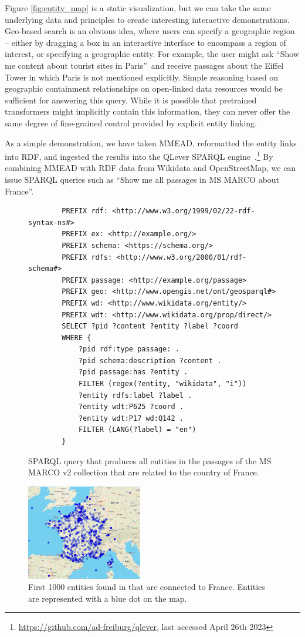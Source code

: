Figure \ref{fig:entity_map} is a static visualization, but we can take the same underlying data and principles to create interesting interactive demonstrations.
Geo-based search is an obvious idea, where users can specify a geographic region -- either by dragging a box in an interactive interface to encompass a region of interest, or specifying a geographic entity.
For example, the user might ask ``Show me content about tourist sites in Paris''\ and receive passages about the Eiffel Tower in which Paris is not mentioned explicitly.
Simple reasoning based on geographic containment relationships on open-linked data resources would be sufficient for answering this query.
While it is possible that pretrained transformers might implicitly contain this information, they can never offer the same degree of fine-grained control provided by explicit entity linking.

As a simple demonstration, we have taken MMEAD, reformatted the entity links into RDF, and ingested the results into the QLever SPARQL engine~\citep{qlever}.\footnote{\url{https://github.com/ad-freiburg/qlever}, last accessed April 26th 2023}
By combining MMEAD with RDF data from Wikidata and OpenStreetMap, we can issue SPARQL queries such as ``Show me all passages in MS MARCO about France''.

\begin{figure}
	\centering
	\begin{lstlisting}
		PREFIX rdf: <http://www.w3.org/1999/02/22-rdf-syntax-ns#>
		PREFIX ex: <http://example.org/> 
		PREFIX schema: <https://schema.org/>
		PREFIX rdfs: <http://www.w3.org/2000/01/rdf-schema#>
		PREFIX passage: <http://example.org/passage> 
		PREFIX geo: <http://www.opengis.net/ont/geosparql#>
		PREFIX wd: <http://www.wikidata.org/entity/>
		PREFIX wdt: <http://www.wikidata.org/prop/direct/>
		SELECT ?pid ?content ?entity ?label ?coord 
		WHERE {
			?pid rdf:type passage: .
			?pid schema:description ?content .
			?pid passage:has ?entity .
			FILTER (regex(?entity, "wikidata", "i"))
			?entity rdfs:label ?label .
			?entity wdt:P625 ?coord .
			?entity wdt:P17 wd:Q142 .
			FILTER (LANG(?label) = "en")
		}
	\end{lstlisting}
	\caption{SPARQL query that produces all entities in the passages of the MS MARCO v2 collection that are related to the country of France.}
	\label{fig:code_sparql}
\end{figure}

\begin{figure}[!t]
	\centering
	\includegraphics[width=0.45\textwidth]{imgs/france.png}
	\caption{First 1000 entities found in that are connected to France. Entities are represented with a blue dot on the map.}
	\label{fig:france}
\end{figure}


